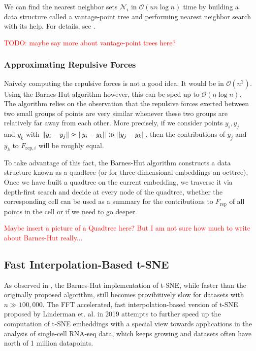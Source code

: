 We can find the nearest neighbor sets $\mathcal{N}_i$ in $\mathcal{O}(u n \log n)$ time by building a data structure called a vantage-point tree and performing nearest neighbor search with its help. For details, see \cite{vdMaa14}. 

\textcolor{red}{TODO: maybe say more about vantage-point trees here?}

\subsubsection{Approximating Repulsive Forces}
Naively computing the repulsive forces is not a good idea. It would be in $\mathcal{O}(n^2)$. 
Using the Barnes-Hut algorithm however, this can be sped up to $\mathcal{O}(n \log n)$. 
The algorithm relies on the observation that the repulsive forces exerted between two small groups of points are very similar whenever these two groups are relatively far away from each other. 
More precisely, if we consider points $y_i, y_j$ and $y_k$ with $\lVert y_i - y_j\rVert \approx \lVert y_i - y_k\rVert \gg \lVert y_j - y_k\rVert$, then the contributions of $y_j$ and $y_k$ to $F_{\text{rep}, i}$ will be roughly equal. 

To take advantage of this fact, the Barnes-Hut algorithm constructs a data structure known as a quadtree (or for three-dimensional embeddings an octtree). Once we have built a quadtree on the current embedding, we traverse it via depth-first search and decide at every node of the quadtree, whether the corresponding cell can be used as a summary for the contributions to $F_{\text{rep}}$ of all points in the cell or if we need to go deeper. 

\textcolor{red}{Maybe insert a picture of a Quadtree here? But I am not sure how much to write about Barnes-Hut really...}

\subsection{Fast Interpolation-Based t-SNE}
As observed in \cite{KoBe19SingleCell}, the Barnes-Hut implementation of t-SNE, while faster than the originally proposed algorithm, still becomes provibitively slow for datasets with $n \gg 100,000$. 
The FFT accelerated, fast interpolation-based version of t-SNE proposed by Linderman et. al. in 2019 \cite{Lin19} attempts to further speed up the computation of t-SNE embeddings with a special view towards applications in the analysis of single-cell RNA-seq data, which keeps growing and datasets often have north of 1 million datapoints. 

